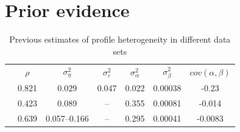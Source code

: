 \section{Prior evidence}
\begin{table}
\begin{tabular}{l|c|c|c|c|c|c}

                        & $\rho$ & $\sigma^2_{\eta}$ & $\sigma^2_{\varepsilon}$ & $\sigma^2_{\alpha}$ & $\sigma^2_{\beta}$ & $cov(\alpha,\beta)$ \\
\citet{Guvenen2009}     & 0.821  &   0.029           &    0.047                 &     0.022           &       0.00038      &      -0.23           \\
\citet{Baker1997}       & 0.423  &   0.089           &     --                   &     0.355           &       0.00081      &      -0.014          \\
\citet{Haider2001}      & 0.639  & 0.057--0.166      &     --                   &     0.295           &       0.00041      &      -0.0083
\end{tabular}
\caption{Previous estimates of profile heterogeneity in different data sets}
\label{tab:hip_literature}
\end{table}

